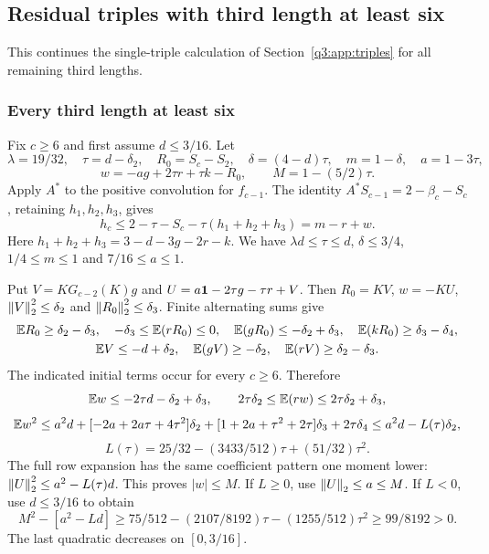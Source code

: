 \subsection{Residual triples with third length at least six}\label{q3:app:longtriples}
This continues the single-triple calculation of Section~\ref{q3:app:triples} for all remaining third lengths.
\subsubsection{Every third length at least six}
Fix $c\ge6$ and first assume $d\le3/16$. Let
\[
 \lambda=19/32,\quad\tau=d-\delta_{2},\quad R_0=S_c-S_2,\quad
 \delta=(4-d)\tau,\quad m=1-\delta,\quad a=1-3\tau,
\]
\[
 w=-ag+2\tau r+\tau k-R_0,\qquad M=1-(5/2)\tau.
\]
Apply $A^*$ to the positive convolution for $f_{c-1}$. The identity
$A^*S_{c-1}=2-\beta_c-S_c$, retaining $h_1,h_2,h_3$, gives
\[
 h_c\le2-\tau-S_c-\tau(h_1+h_2+h_3)=m-r+w .
\]
Here $h_1+h_2+h_3=3-d-3g-2r-k$. We have
$\lambda d\le\tau\le d$, $\delta\le3/4$, $1/4\le m\le1$ and $7/16\le a\le1$.

Put $V=KG_{c-2}(K)g$ and $U=a\mathbf1-2\tau g-\tau r+V$.
Then $R_0=KV$, $w=-KU$, $\left\lVert V\right\rVert_2^2\le \delta_{2}$ and $\left\lVert R_0\right\rVert_2^2\le \delta_{3}$.
Finite alternating sums give
\[
\begin{gathered}
 \mathbb E R_0\ge \delta_{2}-\delta_{3},\quad-\delta_{3}\le\mathbb E(rR_0)\le0,\quad
 \mathbb E(gR_0)\le-\delta_{2}+\delta_{3},\quad\mathbb E(kR_0)\ge \delta_{3}-\delta_{4},\\
 \mathbb E V\le-d+\delta_{2},\quad\mathbb E(gV)\ge-\delta_{2},\quad\mathbb E(rV)\ge \delta_{2}-\delta_{3}.
\end{gathered}
\]
The indicated initial terms occur for every $c\ge6$. Therefore
\[
 \mathbb E w\le-2\tau d-\delta_{2}+\delta_{3},\qquad
 2\tau \delta_{2}\le\mathbb E(rw)\le2\tau \delta_{2}+\delta_{3},
\]
\[
 \mathbb E w^2\le a^2d+[-2a+2a\tau+4\tau^2]\delta_{2}
       +[1+2a+\tau^2+2\tau]\delta_{3}+2\tau \delta_{4}
 \le a^2d-L(\tau)\delta_{2},
\]
\[
 L(\tau)=25/32-(3433/512)\tau+(51/32)\tau^2.
\]
The full row expansion has the same coefficient pattern one moment lower:
$\left\lVert U\right\rVert_2^2\le a^2-L(\tau)d$. This proves $|w|\le M$. If $L\ge0$, use $\left\lVert U\right\rVert_2\le a\le M$. If $L<0$, use $d\le3/16$ to obtain
\[
 M^2-[a^2-Ld]\ge
 75/512-(2107/8192)\tau-(1255/512)\tau^2\ge99/8192>0 .
\]
The last quadratic decreases on $[0,3/16]$.

